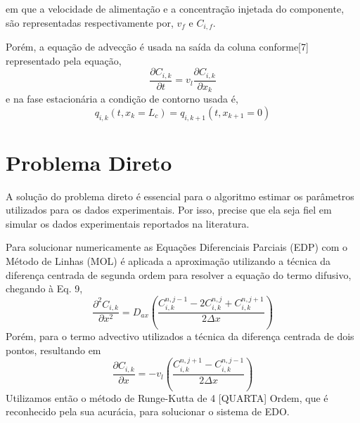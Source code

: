 \documentclass[por]{Template_SBEF}
\begin{document}
em que a velocidade de alimentação e a concentração injetada do componente, são representadas respectivamente por, $v_f$ e $C_{i,f}$.

Porém, a equação de advecção é usada na saída da coluna conforme[7] representado pela equação,
\begin{equation}
\frac{\partial C_{i,k}}{\partial t} = v_l \frac{\partial C_{i,k}}{\partial x_k}
\end{equation}
 e na fase estacionária a condição de contorno usada é,
 \begin{equation}
 q_{i,k}(t,x_k = L_c) = q_{i,k+1}(t, x_{k+1} = 0)
 \end{equation}

\section{Problema Direto}
A solução do problema direto é essencial para o algoritmo estimar os parâmetros utilizados para os dados experimentais. Por isso, precise que ela seja fiel em simular os dados experimentais reportados na literatura.

Para solucionar numericamente as Equações Diferenciais Parciais (EDP) com o Método de Linhas (MOL) é aplicada a aproximação utilizando a técnica da diferença centrada de segunda ordem para resolver a equação do termo difusivo, chegando à Eq. 9,
\begin{equation}
\frac{\partial^2 C_{i,k}}{\partial x^2} = D_{ax}(\frac{C_{i,k}^{n,j-1} - 2C_{i,k}^{n,j} + C_{i,k}^{n,j+1}}{2\Delta x})
\end{equation}
Porém, para o termo advectivo utilizados a técnica da diferença centrada de dois pontos, resultando em
\begin{equation}
\frac{\partial C_{i,k}}{\partial x} = - v_l (\frac{C_{i,k}^{n,j+1} - C_{i,k}^{n,j-1}}{2\Delta x})
\end{equation}
Utilizamos então o método de Runge-Kutta de 4 [QUARTA] Ordem, que é reconhecido pela sua acurácia, para solucionar o sistema de EDO.
\end{document}
